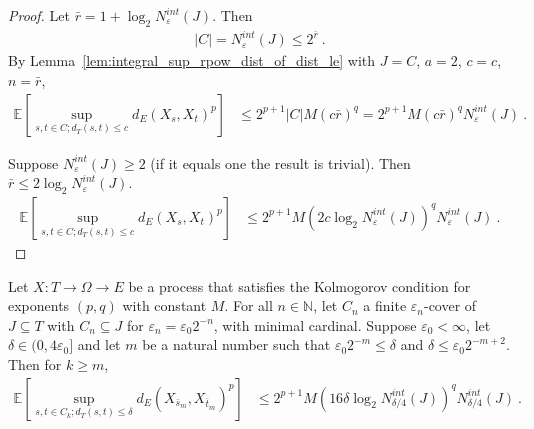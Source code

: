 \begin{proof}\leanok
Let $\bar{r} = 1 + \log_2 N^{int}_{\varepsilon}(J)$. Then
\begin{align*}
  \vert C \vert
  = N^{int}_{\varepsilon}(J)
  \le 2^{\bar{r}}
  \: .
\end{align*}
By Lemma~\ref{lem:integral_sup_rpow_dist_of_dist_le} with $J = C$, $a = 2$, $c = c$, $n = \bar{r}$,
\begin{align*}
  \mathbb{E} \left[ \sup_{s, t \in C; d_T(s, t) \le c} d_E(X_s, X_t)^p \right]
  &\le 2^{p+1} |C| M (c \bar{r})^q
  = 2^{p+1} M (c \bar{r})^q N^{int}_{\varepsilon}(J)
  \: .
\end{align*}

Suppose $N^{int}_{\varepsilon}(J) \ge 2$ (if it equals one the result is trivial).
Then $\bar{r} \le 2 \log_2 N^{int}_{\varepsilon}(J)$.
\begin{align*}
  \mathbb{E} \left[ \sup_{s, t \in C; d_T(s, t) \le c} d_E(X_s, X_t)^p \right]
  &\le 2^{p+1} M \left(2 c \log_2 N^{int}_{\varepsilon}(J) \right)^q  N^{int}_{\varepsilon}(J)
  \: .
\end{align*}
\end{proof}

\begin{lemma}\label{lem:integral_sup_rpow_dist_cover_rescale}
  \leanok
Let $X : T \to \Omega \to E$ be a process that satisfies the Kolmogorov condition for exponents $(p,q)$ with constant $M$.
For all $n \in \mathbb{N}$, let $C_n$ a finite $\varepsilon_n$-cover of $J \subseteq T$ with $C_n \subseteq J$ for $\varepsilon_n = \varepsilon_0 2^{-n}$, with minimal cardinal.
Suppose $\varepsilon_0 < \infty$, let $\delta \in (0, 4 \varepsilon_0]$ and let $m$ be a natural number such that $\varepsilon_0 2^{-m} \le \delta$ and $\delta \le \varepsilon_0 2^{-m+2}$.
Then for $k \ge m$,
\begin{align*}
  \mathbb{E} \left[ \sup_{s, t \in C_k; d_T(s, t) \le \delta} d_E(X_{\bar{s}_m}, X_{\bar{t}_m})^p \right]
  &\le 2^{p+1} M \left(16 \delta \log_2 N^{int}_{\delta/4}(J) \right)^q  N^{int}_{\delta/4}(J)
  \: .
\end{align*}
\end{lemma}


